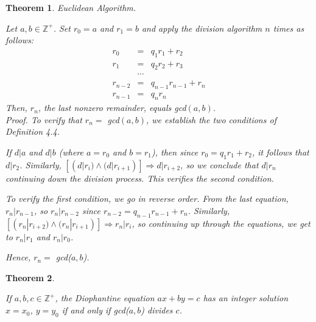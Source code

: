 \documentclass[12pt]{article}
\newtheorem{theorem}{Theorem} [section]
\begin{document}
\begin{theorem} Euclidean Algorithm.
\begin{em}
Let $a, b \in \mathbb{Z}^+$. Set $r_0 = a$ and $r_1 = b$ and apply the division algorithm $n$ times as follows:
\begin{eqnarray*}
r_0 &=& q_1r_1 + r_2\\
r_1 &=& q_2r_2 + r_3\\
&\cdots&\\
r_{n-2} &=& q_{n-1}r_{n-1} + r_n\\
r_{n-1} &=& q_nr_n
\end{eqnarray*}
Then, $r_n$, the last nonzero remainder, equals gcd$(a, b)$.\\
\emph{Proof.} To verify that $r_n =$ gcd$(a, b)$, we establish the two conditions of Definition 4.4.

If $d|a$ and $d|b$ (where $a=r_0$ and $b=r_1$), then since $r_0=q_1r_1 + r_2$, it follows that $d|r_2$. Similarly, $[(d|r_i) \wedge (d|r_{i+1})] \Rightarrow d|r_{i+2}$, so we conclude that $d|r_n$ continuing down the division process. This verifies the second condition.

To verify the first condition, we go in reverse order. From the last equation, $r_n|r_{n-1}$, so $r_n|r_{n-2}$ since $r_{n-2} = q_{n-1}r_{n-1} + r_n$. Similarly, $[(r_n|r_{i+2}) \wedge (r_n|r_{i+1})] \Rightarrow r_n|r_i$, so continuing up through the equations, we get to $r_n|r_1$ and $r_n|r_0$.

Hence, $r_n =$ gcd($a, b$).
\end{em}
\end{theorem}
\begin{theorem}
\begin{em}
If $a, b, c \in \mathbb{Z}^+$, the Diophantine equation $ax+by=c$ has an integer solution $x=x_0$, $y=y_0$ if and only if gcd($a, b$) divides $c$.
\end{em}
\end{theorem}
\end{document}
